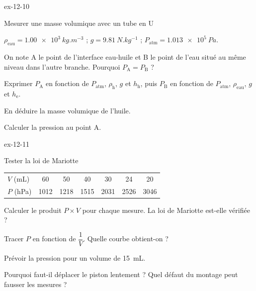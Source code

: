 \begin{blocLivre}{ex-12-10}
\begin{exercice}[2]{Mesurer une masse volumique avec un tube en U}
\begin{donnees}
$\rho_\mathrm{eau}=\qty{1,00e3}{kg.m^{-3}}$ ; $g=\qty{9,81}{N.kg^{-1}}$ ; $P_\mathrm{atm}=\qty{1,013e5}{Pa}$.
\end{donnees}
\begin{questions}
\item On note A le point de l'interface eau-huile et B le point de l'eau situé au même niveau dans l'autre branche. Pourquoi
$P_\mathrm{A}=P_\mathrm{B}$ ?
\item Exprimer $P_\mathrm{A}$ en fonction de $P_\mathrm{atm}$, $\rho_\mathrm{h}$, $g$ et $h_\mathrm{h}$, puis $P_\mathrm{B}$ en fonction de $P_\mathrm{atm}$, $\rho_\mathrm{eau}$, $g$ et $h_\mathrm{e}$.
\item En déduire la masse volumique de l'huile.
\item Calculer la pression au point A.
\end{questions}
\end{exercice}
\end{blocLivre}
\begin{blocLivre}{ex-12-11}
\begin{exercice}[2]{Tester la loi de Mariotte}
\par\smallskip\noindent\hfill\begin{tabular}{lcccccc}
\toprule
$V$ (mL) & 60 & 50 & 40 & 30 & 24 & 20 \\
$P$ (hPa) & 1012 & 1218 & 1515 & 2031 & 2526 & 3046 \\
\bottomrule
\end{tabular}\hfill\null\par\smallskip
\begin{questions}
\item Calculer le produit $P\times V$ pour chaque mesure. La loi de Mariotte est-elle vérifiée ?
\item Tracer $P$ en fonction de $\dfrac{1}{V}$. Quelle courbe obtient-on ?
\item Prévoir la pression pour un volume de \qty{15}{mL}.
\item Pourquoi faut-il déplacer le piston lentement ? Quel défaut du montage peut fausser les mesures ?
\end{questions}
\end{exercice}
\end{blocLivre}
